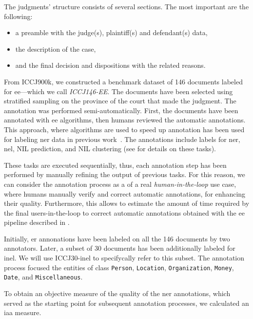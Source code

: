 The judgments' structure consists of several sections. The most important are the following:
\begin{itemize}
    \item a preamble with the judge(s), plaintiff(s) and defendant(s) data,
    \item the description of the case,
    \item and the final decision and dispositions with the related reasons.
\end{itemize}


From ICCJ900k, we constructed a benchmark dataset of 146 documents labeled for \acf{ee}---which we call \emph{ICCJ146-EE}. The documents have been selected using stratified sampling on the province of the court that made the judgment.
The annotation was performed semi-automatically. First, the documents have been annotated with \ac{ee} algorithms, then humans reviewed the automatic annotations. This approach, where algorithms are used to speed up annotation has been used for labeling \ac{ner} data in previous work~\cite{lrec2022kind}.
The annotations include labels for \ac{ner}, \ac{nel}, NIL prediction, and NIL clustering (see  for details on these tasks).

These tasks are executed sequentially, thus, each annotation step has been performed by manually refining the output of previous tasks. For this reason, we can consider the annotation process as a  of a real \emph{human-in-the-loop} use case, where humans manually verify and correct automatic annotations, for enhancing their quality.
Furthermore, this  allows to estimate the amount of time required by the final users-in-the-loop to correct automatic annotations obtained with the \ac{ee} pipeline described in .

Initially, \ac{er} annonations have been labeled on all the 146 documents by two annotators. Later, a subset of 30 documents has been additionally labeled for \ac{inel}. We will use ICCJ30-\ac{inel} to specifycally refer to this subset.
The annotation process focused the entities of class \texttt{Person}, \texttt{Location}, \texttt{Organization}, \texttt{Money}, \texttt{Date}, and \texttt{Miscellaneous}.


To obtain an objective measure of the quality of the \ac{ner} annotations, which served as the starting point for subsequent annotation processes, we calculated an \acf{iaa} measure.

